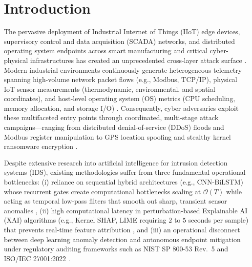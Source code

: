 \documentclass[11pt,a4paper]{article}
\begin{document}
\clearpage

\section{Introduction}
\label{sec:introduction}

The pervasive deployment of Industrial Internet of Things (IIoT) edge devices, supervisory control and data acquisition (SCADA) networks, and distributed operating system endpoints across smart manufacturing and critical cyber-physical infrastructures has created an unprecedented cross-layer attack surface \cite{moustafa2021ton_iot_framework, demertzis2023cyber_ai_survey}. Modern industrial environments continuously generate heterogeneous telemetry spanning high-volume network packet flows (e.g., Modbus, TCP/IP), physical IoT sensor measurements (thermodynamic, environmental, and spatial coordinates), and host-level operating system (OS) metrics (CPU scheduling, memory allocation, and storage I/O) \cite{al2020ton_iot, lin2023transformer_multimodal}. Consequently, cyber adversaries exploit these multifaceted entry points through coordinated, multi-stage attack campaigns—ranging from distributed denial-of-service (DDoS) floods and Modbus register manipulation to GPS location spoofing and stealthy kernel ransomware encryption \cite{alazab2024malware_forensics, samuel2024threat_modeling}.

Despite extensive research into artificial intelligence for intrusion detection systems (IDS), existing methodologies suffer from three fundamental operational bottlenecks: (i) reliance on sequential hybrid architectures (e.g., CNN-BiLSTM) whose recurrent gates create computational bottlenecks scaling at $\mathcal{O}(T)$ while acting as temporal low-pass filters that smooth out sharp, transient sensor anomalies \cite{popoola2021deep_ids, conformer_bigru_ajse2025}, (ii) high computational latency in perturbation-based Explainable AI (XAI) algorithms (e.g., Kernel SHAP, LIME requiring $2$ to $5$ seconds per sample) that prevents real-time feature attribution \cite{kumar2023explainable_iiot, islam2025fast_xai_edge}, and (iii) an operational disconnect between deep learning anomaly detection and autonomous endpoint mitigation under regulatory auditing frameworks such as NIST SP 800-53 Rev.~5 \cite{nist_sp800_53} and ISO/IEC 27001:2022 \cite{iso27001_2022}.
\end{document}
